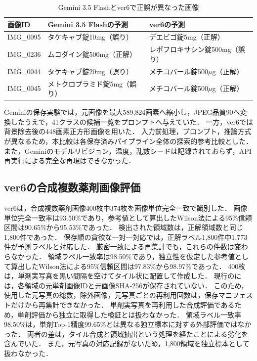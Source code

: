 \documentclass[uplatex,dvipdfmx]{jsarticle}
\begin{document}
\begin{table}[H]
  \centering
  \caption{Gemini 3.5 Flashとver6で正誤が異なった画像}
  \label{tab:discordant_gemini_ver6}
  \scriptsize
  \begin{tabular}{|p{1.8cm}|p{4.2cm}|p{4.2cm}|}
    \hline
    画像ID & Gemini 3.5 Flashの予測 & ver6の予測 \\ \hline
    IMG\_0095 & タケキャブ錠10mg（誤り） & デエビゴ錠5mg（正解） \\ \hline
    IMG\_0236 & ムコダイン錠500mg（正解） & レボフロキサシン錠500mg（誤り） \\ \hline
    IMG\_0044 & タケキャブ錠20mg（誤り） & メチコバール錠500$\mu$g（正解） \\ \hline
    IMG\_0045 & メトクロプラミド錠5mg（誤り） & メチコバール錠500$\mu$g（正解） \\ \hline
  \end{tabular}
\end{table}

Geminiの保存実験では，元画像を最大589,824画素へ縮小し，JPEG品質90へ変換したうえで，41クラスの候補一覧をプロンプトへ与えていた．
一方，ver6では背景除去後の448画素正方形画像を用いた．
入力前処理，プロンプト，推論方式が異なるため，本比較は各保存済みパイプライン全体の探索的参考比較とした．
また，Geminiのモデルリビジョン，温度，乱数シードは記録されておらず，API再実行による完全な再現はできなかった．

\subsection{ver6の合成複数薬剤画像評価}\label{sec:ver6_multi}

ver6は，合成複数薬剤画像400枚中374枚を画像単位完全一致で識別した．
画像単位完全一致率は93.50\%であり，参考値として算出したWilson法による95\%信頼区間は90.65\%から95.53\%であった．
検出された領域数は，正解領域数と同じ1,800件であった．
保存順の貪欲な一対一対応では，正解ラベル1,800件中1,773件が予測ラベルと対応した．
厳密一致による再集計でも，これらの件数は変わらなかった．
領域ラベル一致率は98.50\%であり，独立性を仮定した参考値として算出したWilson法による95\%信頼区間は97.83\%から98.97\%であった．
400枚は，単剤実写真を黒い間隔を空けてタイル状に配置して作成した．
現行のには，各領域の元単剤画像IDと元画像SHA-256が保存されていない．
このため，使用した元写真の総数，除外画像，元写真ごとの再利用回数は，保存マニフェストだけから再集計できなかった．
単剤実写真を再利用した合成評価であるため，単剤評価から独立に取得した検証とは扱わなかった．
領域ラベル一致率98.50\%は，単剤Top-1精度99.65\%とは異なる独立標本に対する外部評価ではなかった．
両者の差は，タイル合成と領域抽出という処理を経たことによる劣化を含んでいた．
また，元写真の対応記録がないため，1,800領域を独立標本として扱わなかった．
\end{document}
